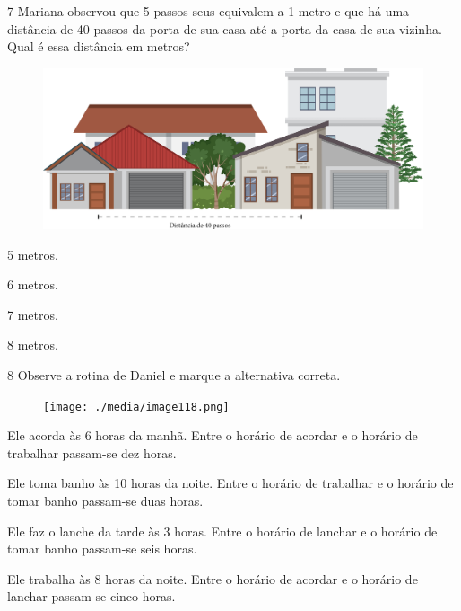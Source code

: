 \pagebreak

\num{7} Mariana observou que 5 passos seus equivalem a 1 metro e que há uma
distância de 40 passos da porta de sua casa até a porta da casa de sua vizinha. Qual é essa distância em metros?

\begin{figure}[htpb!]
\includegraphics[width=\textwidth]{./media/image117.png}
\end{figure}

\begin{escolha}
\item 5 metros.

\item 6 metros.

\item 7 metros.

\item 8 metros.
\end{escolha}

\pagebreak
\num{8} Observe a rotina de Daniel e marque a alternativa correta.

\begin{figure}[htpb!]
\centering
\texttt{[image: ./media/image118.png]}
\end{figure}

\begin{escolha}
\item Ele acorda às 6 horas da manhã. Entre o horário de acordar e o horário de trabalhar passam-se dez horas.

\item Ele toma banho às 10 horas da noite. Entre o horário de trabalhar e o horário de tomar banho passam-se duas horas.

\item Ele faz o lanche da tarde às 3 horas. Entre o horário de lanchar e o horário de tomar banho passam-se seis horas.

\item Ele trabalha às 8 horas da noite. Entre o horário de acordar e o horário de lanchar passam-se cinco horas.
\end{escolha}


